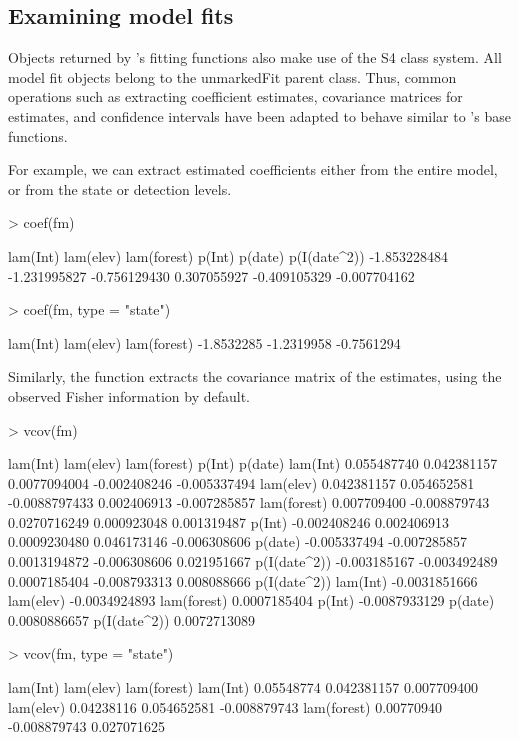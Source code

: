 \documentclass[article,shortnames]{jss}
\newcommand{\um}{\pkg{unmarked}}
\newcommand{\rlang}{\proglang{R}}
\begin{document}
\subsection{Examining model fits}
\label{sec:examining-model-fits}

Objects returned by \um's fitting functions also make use of the S4
class system.  All model fit objects belong to the unmarkedFit parent
class.  Thus, common operations such as extracting coefficient
estimates, covariance matrices for estimates, and confidence intervals
have been adapted to behave similar to \rlang's base functions.


For example, we can extract estimated coefficients either from the
entire model, or from the state or detection levels.

\begin{Schunk}
\begin{Sinput}
> coef(fm)
\end{Sinput}
\begin{Soutput}
    lam(Int)    lam(elev)  lam(forest)       p(Int)      p(date) p(I(date^2)) 
-1.853228484 -1.231995827 -0.756129430  0.307055927 -0.409105329 -0.007704162 
\end{Soutput}
\begin{Sinput}
> coef(fm, type = "state")
\end{Sinput}
\begin{Soutput}
   lam(Int)   lam(elev) lam(forest) 
 -1.8532285  -1.2319958  -0.7561294 
\end{Soutput}
\end{Schunk}

Similarly, the  function extracts the covariance matrix of
the estimates, using the observed Fisher information by default.

\begin{Schunk}
\begin{Sinput}
> vcov(fm)
\end{Sinput}
\begin{Soutput}
                 lam(Int)    lam(elev)   lam(forest)       p(Int)      p(date)
lam(Int)      0.055487740  0.042381157  0.0077094004 -0.002408246 -0.005337494
lam(elev)     0.042381157  0.054652581 -0.0088797433  0.002406913 -0.007285857
lam(forest)   0.007709400 -0.008879743  0.0270716249  0.000923048  0.001319487
p(Int)       -0.002408246  0.002406913  0.0009230480  0.046173146 -0.006308606
p(date)      -0.005337494 -0.007285857  0.0013194872 -0.006308606  0.021951667
p(I(date^2)) -0.003185167 -0.003492489  0.0007185404 -0.008793313  0.008088666
              p(I(date^2))
lam(Int)     -0.0031851666
lam(elev)    -0.0034924893
lam(forest)   0.0007185404
p(Int)       -0.0087933129
p(date)       0.0080886657
p(I(date^2))  0.0072713089
\end{Soutput}
\begin{Sinput}
> vcov(fm, type = "state")
\end{Sinput}
\begin{Soutput}
              lam(Int)    lam(elev)  lam(forest)
lam(Int)    0.05548774  0.042381157  0.007709400
lam(elev)   0.04238116  0.054652581 -0.008879743
lam(forest) 0.00770940 -0.008879743  0.027071625
\end{Soutput}
\end{Schunk}
\end{document}
